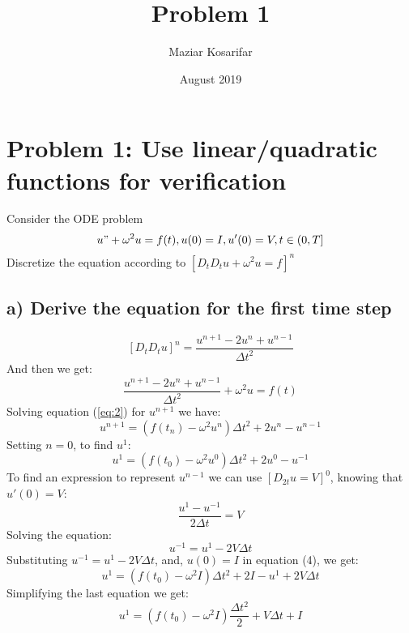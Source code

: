 \documentclass{article}
\title{Problem 1}
\author{Maziar Kosarifar}
\date{August 2019}
\begin{document}
\maketitle

\section*{Problem 1: Use linear/quadratic functions for verification}
Consider the ODE problem
$$u" + \omega^2 u = f(t), u(0) = I, u'(0) = V, t \in (0, T]$$
Discretize the equation according to $[D_t D_t u + \omega^2 u = f]^n$
    \subsection*{a) Derive the equation for the first time step}
        \begin{equation} \label{eq:1}
            {[D_t D_t u]}^n = \frac{u^{n+1} - 2u^n + u^{n-1}}{{\Delta t}^2}
        \end{equation}
        And then we get:
        \begin{equation}\label{eq:2}
            \frac{u^{n+1} - 2u^n + u^{n-1}}{{\Delta t}^2} + \omega^2 u = f(t)
        \end{equation}
        Solving equation (\ref{eq:2}) for $u^{n+1}$ we have:
        \begin{equation}
            u^{n+1} = (f(t_n) - \omega^2 u^n) \Delta t^2 + 2u^n - u^{n-1}
        \end{equation}
        Setting $n = 0$, to find $u^1$:
        \begin{equation}
            u^{1} = (f(t_0) - \omega^2 u^0) \Delta t^2 + 2u^0 - u^{-1}
        \end{equation}
        To find an expression to represent $u^{n-1}$ we can use $[D_{2t}u =  V]^0$, knowing that $u'(0) = V$:
        \begin{equation}
            \frac{u^{1} - u^{-1}}{2\Delta t} = V
        \end{equation}
        Solving the equation:
        \begin{equation}
            u^{-1} = u^{1} - 2V\Delta t
        \end{equation}
        Substituting $u^{-1} = u^{1} - 2V\Delta t$, and, $u(0) = I$ in equation (4), we get:
        \begin{equation}
            u^{1} = (f(t_0) - \omega^2 I) \Delta t^2 + 2I - u^{1} + 2V\Delta t
        \end{equation}
        Simplifying the last equation we get:
        \begin{equation}
            u^{1} = (f(t_0) - \omega^2 I) \frac{\Delta t^2}{2} + V\Delta t + I
        \end{equation}
    
\end{document}
